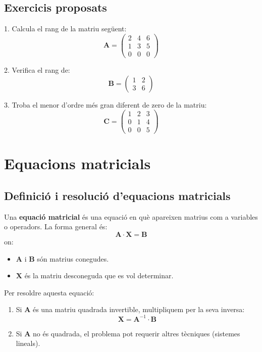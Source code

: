 \documentclass[12pt]{article}
\newcommand{\mat}[1]{\mathbf{#1}}
\begin{document}
\subsection*{Exercicis proposats}
\begin{exercici}
1. Calcula el rang de la matriu següent:
\[
\mat{A} = \begin{pmatrix}
2 & 4 & 6 \\
1 & 3 & 5 \\
0 & 0 & 0
\end{pmatrix}
\]

2. Verifica el rang de:
\[
\mat{B} = \begin{pmatrix}
1 & 2 \\
3 & 6
\end{pmatrix}
\]

3. Troba el menor d'ordre més gran diferent de zero de la matriu:
\[
\mat{C} = \begin{pmatrix}
1 & 2 & 3 \\
0 & 1 & 4 \\
0 & 0 & 5
\end{pmatrix}
\]
\end{exercici}

\newpage

\section{Equacions matricials}

\subsection{Definició i resolució d'equacions matricials}
\begin{concept}
Una \textbf{equació matricial} és una equació en què apareixen matrius com a variables o operadors. La forma general és:
\[
\mat{A} \cdot \mat{X} = \mat{B}
\]
on:
\begin{itemize}
    \item $\mat{A}$ i $\mat{B}$ són matrius conegudes.
    \item $\mat{X}$ és la matriu desconeguda que es vol determinar.
\end{itemize}
Per resoldre aquesta equació:
\begin{enumerate}
    \item Si $\mat{A}$ és una matriu quadrada invertible, multipliquem per la seva inversa:
    \[
    \mat{X} = \mat{A}^{-1} \cdot \mat{B}
    \]
    \item Si $\mat{A}$ no és quadrada, el problema pot requerir altres tècniques (sistemes lineals).
\end{enumerate}
\end{concept}
\end{document}
